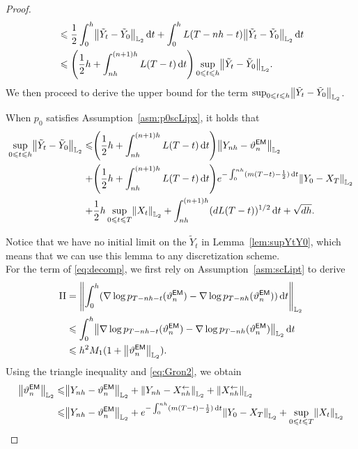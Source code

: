 \begin{proof}
\begin{align*}
    &\leqslant \dfrac{1}{2}\int_0^h\l|\tilde{Y}_t-\tilde{Y}_0\r|_{\Ltwo}\rmd t+\int_0^hL(T-nh-t)\l|\tilde{Y}_t-\tilde{Y}_0\r|_{\Ltwo}\rmd t\\
    &\leqslant \left(\dfrac{1}{2}h+\int_{nh}^{(n+1)h}L(T-t)\rmd t\right)\sup_{0\leqslant t\leqslant h}\l|\tilde{Y}_t-\tilde{Y}_0\r|_{\Ltwo}.
\end{align*}
We then proceed to derive the upper bound for the term $\sup_{0\leqslant t\leqslant h}\l|\tilde{Y}_t-\tilde{Y}_0\r|_{\Ltwo}$.
\begin{lemma}
    \label{lem:supYtY0}
    When $p_0$ satisfies Assumption~\ref{asm:p0scLipx}, it holds that
    \begin{align*}
        \sup_{0\leqslant t\leqslant h}\l|\tilde{Y}_t-\tilde{Y}_0\r|_{\Ltwo}\leqslant &\left(\dfrac{1}{2}h+\int_{nh}^{(n+1)h}L(T-t)\rmd t\right)\l|Y_{nh}-\vartheta_n^{\sf EM}\r|_{\Ltwo}\\
        +&\left(\dfrac{1}{2}h+\int_{nh}^{(n+1)h}L(T-t)\rmd t\right)e^{-\int_0^{nh}(m(T-t)-\frac{1}{2})\rmd t}\l|Y_0-X_T\r|_{\Ltwo}\\
        +&\dfrac{1}{2}h\sup_{0\leqslant t\leqslant T}\l|X_t\r|_{\Ltwo}+\int_{nh}^{(n+1)h}(dL(T-t))^{1/2}\rmd t+\sqrt{dh}.
    \end{align*}
\end{lemma}
Notice that we have no initial limit on the $\tilde{Y}_t$ in Lemma~\ref{lem:supYtY0}, which means that we can use this lemma to any discretization scheme.\\
For the term  of \eqref{eq:decomp}, we first rely on Assumption~\ref{asm:scLipt} to derive
\begin{align*}
   \rm{II} &=\left\lVert \int_0^h(\nabla\log p_{T-nh-t}(\vartheta_n^{\sf EM})-\nabla\log p_{T-nh}(\vartheta_n^{\sf EM}))\rmd t\right\rVert_{\Ltwo}\\
    &\leqslant \int_0^h\l|\nabla\log p_{T-nh-t}(\vartheta_n^{\sf EM})-\nabla\log p_{T-nh}(\vartheta_n^{\sf EM})\r|_{\Ltwo}\rmd t\\
    &\leqslant h^2M_1(1+\l|\vartheta_n^{\sf EM}\r|_{\Ltwo}).
\end{align*}
Using the triangle inequality and \eqref{eq:Gron2}, we obtain
\begin{equation}
    \begin{aligned}
        \l|\vartheta_n^{\sf EM}\r|_{\Ltwo}\leqslant&\l|Y_{nh}-\vartheta_n^{\sf EM}\r|_{\Ltwo}+\l|Y_{nh}-X_{nh}^{\leftarrow}\r|_{\Ltwo}+\l|X_{nh}^{\leftarrow}\r|_{\Ltwo}\\
        \leqslant&\l|Y_{nh}-\vartheta_n^{\sf EM}\r|_{\Ltwo}+e^{-\int_0^{nh}(m(T-t)-\frac{1}{2})\rmd t}\l|Y_0-X_T\r|_{\Ltwo}+\sup_{0\leqslant t\leqslant T}\l|X_t\r|_{\Ltwo}

\end{aligned}
\end{equation}
\end{proof}

